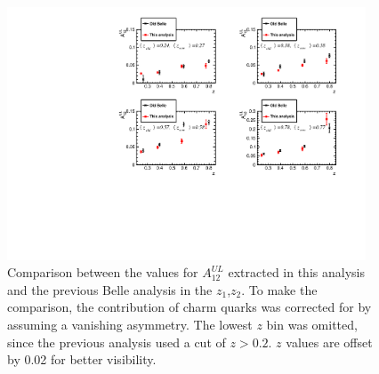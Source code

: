\documentclass[aps,prX,preprint,groupedaddress,linenumbers]{revtex4-1}
\begin{document}
\begin{figure}
\includegraphics[width=0.95\textwidth]{figs_paper/BelleCompZ25.pdf}
\caption{\label{fig:belleComp} Comparison between the values for $A^{UL}_{12}$ extracted in this analysis and the previous Belle analysis in the $z_1$,$z_2$. To make the comparison, the  contribution of charm quarks was corrected for by assuming a vanishing asymmetry. The lowest $z$ bin was omitted, since the previous analysis used a cut of $z>0.2$. $z$ values are offset by 0.02 for better visibility.\label{fig:resOldBelleComp}}
\end{figure}


\end{document}
